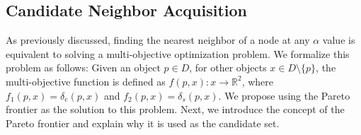 \vspace*{-0.5em}
\subsection{Candidate Neighbor Acquisition}
\label{sec:candidate-acquisition}
As previously discussed, finding the nearest neighbor of a node at any $\alpha$ value is equivalent to solving a multi-objective optimization problem.
We formalize this problem as follows: Given an object $p \in D$, for other objects $x \in D\setminus \{p\}$, the multi-objective function is defined as $f(p, x): x \rightarrow \mathbb{R}^2$, where $f_1(p, x) = \delta_e(p, x)$ and $f_2(p, x) = \delta_s(p, x)$. 
We propose using the Pareto frontier as the solution to this problem. Next, we introduce the concept of the Pareto frontier and explain why it is used as the 
candidate set.




